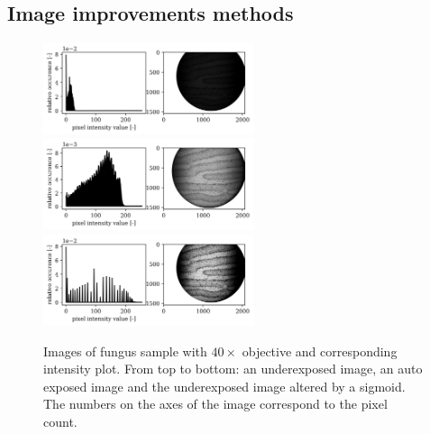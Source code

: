 \newpage

\subsection{Image improvements methods}

\begin{figure}
  \centering
  \includegraphics[width=0.55\textwidth,keepaspectratio]{afbeeldingen/Histogram_results/donkerhistogram.png}
  \vspace{3mm}
  \includegraphics[width=0.55\textwidth,keepaspectratio]{afbeeldingen/Histogram_results/lichthistogram.png}
  \vspace{3mm}
  \includegraphics[width=0.55\textwidth,keepaspectratio]{afbeeldingen/Histogram_results/improved_contrast_histogram.png}
  \vspace{3mm}
  \caption{Images of fungus sample with $40 \times$ objective and corresponding intensity plot. From top to bottom: an underexposed image, an auto exposed image and the underexposed image altered by a sigmoid. The numbers on the axes of the image correspond to the pixel count.}
  \label{fig:contrast_improvement}
\end{figure}

